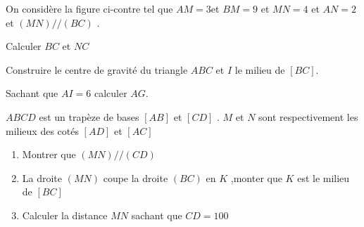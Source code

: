 \documentclass[a4paper,12pt]{article}
\begin{document}
\begin{exo}[8]
On considère la figure ci-contre tel que $AM=3$\newline et $BM=9$ et $MN=4$ et $AN=2$ et $(MN)//(BC)$ . 
\begin{enumerate}
\begin{minipage}{0.6\linewidth}
\item Calculer $BC$ et $NC$
\anserline[4]
\item Construire le centre de gravité du triangle $ABC$ et $I$ le milieu de $[BC]$.
\end{minipage}
\begin{minipage}{0.4\linewidth}
\end{minipage}
\item Sachant que  $AI=6$ calculer $AG$.
\end{enumerate}
\anserline[2]
\end{exo}

\begin{exo}[6]
$ABCD$ est un trapèze de bases $[AB]$ et $[CD]$ . $M$ et $N$ sont respectivement les milieux des cotés $[AD]$ et $[AC]$ 
\begin{enumerate}
\item Montrer que $(MN)//(CD)$\newline
\anserline[3]
\item La droite $(MN)$ coupe la droite $(BC)$ en $K$ ,monter que $K$ est le milieu de $[BC]$\newline
\anserline[3]
\item Calculer la distance $MN$ sachant que $CD=100$\newline
\anserline[3]
\end{enumerate}
\end{exo}
\end{document}
